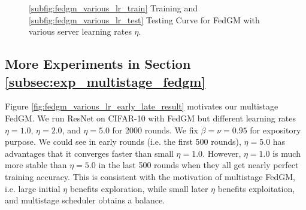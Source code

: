 \begin{figure}[h]
\vspace*{-6pt}
\centering
{}
\vspace*{-6pt}
\caption{\ref{subfig:fedgm_various_lr_train} Training and \ref{subfig:fedgm_various_lr_test} Testing Curve for FedGM with various server learning rates $\eta$.}
\label{fig:fedgm_various_lr_result}
\end{figure}


\subsection{More Experiments in Section \ref{subsec:exp_multistage_fedgm}}
\label{subsec:more_exp_multistage_appendix}

Figure \ref{fig:fedgm_various_lr_early_late_result} motivates our multistage FedGM. We run ResNet on CIFAR-10 with FedGM but different learning rates $\eta=1.0$, $\eta=2.0$, and $\eta=5.0$ for 2000 rounds. We fix $\beta=\nu=0.95$ for expository purpose. We could see in early rounds (i.e. the first 500 rounds), $\eta=5.0$ has advantages that it converges faster than small $\eta=1.0$. However, $\eta=1.0$ is much more stable than  $\eta=5.0$ in the last 500 rounds when they all get nearly perfect training accuracy. This is consistent with the motivation of multistage FedGM, i.e. large initial $\eta$ benefits exploration, while small later $\eta$ benefits exploitation, and multistage scheduler obtains a balance.



